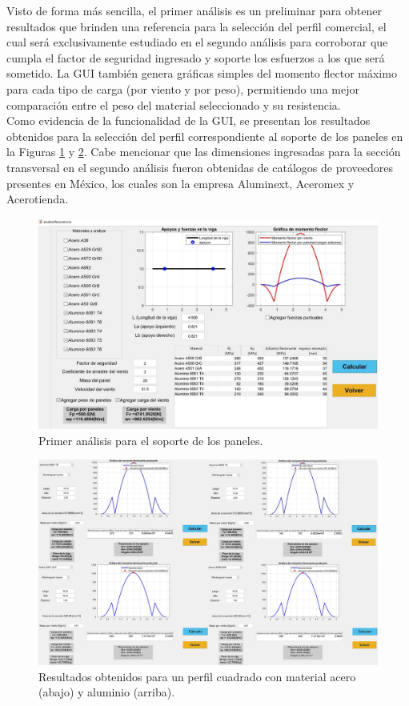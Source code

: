 Visto de forma más sencilla, el primer análisis es un preliminar para obtener resultados que brinden una referencia para la selección del perfil comercial, el cual será exclusivamente estudiado en el segundo análisis para corroborar que cumpla el factor de seguridad ingresado y soporte los esfuerzos a los que será sometido. La GUI también genera gráficas simples del momento flector máximo para cada tipo de carga (por viento y por peso), permitiendo una mejor comparación entre el peso del material seleccionado y su resistencia.\\

Como evidencia de la funcionalidad de la GUI, se presentan los resultados obtenidos para la selección del perfil correspondiente al soporte de los paneles en la Figuras \ref{fig:GUI_1} y \ref{fig:GUI_2}. Cabe mencionar que las dimensiones ingresadas para la sección transversal en el segundo análisis fueron obtenidas de catálogos de proveedores presentes en México, los cuales son la empresa Aluminext, Aceromex y Acerotienda.

\begin{figure}[H]
	\centering
	\includegraphics[width=\columnwidth]{imagenes/GUI_1}
	\caption{Primer análisis para el soporte de los paneles.}
	\label{fig:GUI_1}
\end{figure}

\begin{figure}[H]
	\centering
	\includegraphics[width=\columnwidth]{imagenes/GUI_2}
	\caption{Resultados obtenidos para un perfil cuadrado con material acero (abajo) y aluminio (arriba).}
	\label{fig:GUI_2}
\end{figure}

